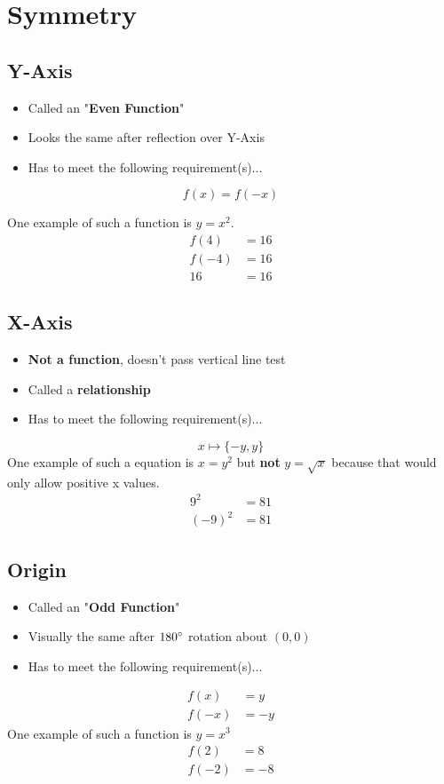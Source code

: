 \documentclass[twocolumn]{article}
\newcommand{\bd}{\textbf}
\newcommand{\dquad}{\quad{}\quad{}}
\begin{document}
	\section{Symmetry}
	\subsection{Y-Axis}
	\begin{itemize}[label=\dquad{}--]
		\item Called an "\bd{Even Function}"
		\item Looks the same after reflection over Y-Axis
		\item Has to meet the following requirement(s)...
	\end{itemize}
	\begin{equation*}
		f(x) = f(-x)
	\end{equation*}
	\par One example of such a function is $y = x^2$.
	\begin{align*}
		f(4) &= 16 \\
		f(-4) &= 16 \\
		16 &= 16
	\end{align*}
	
	\subsection{X-Axis}
	\begin{itemize}[label=\dquad{}--]
		\item \bd{Not a function}, doesn't pass vertical line test
		\item Called a \bd{relationship}
		\item Has to meet the following requirement(s)...
	\end{itemize}
	\begin{equation*}
		x \mapsto \{-y,  y\}
	\end{equation*}
	One example of such a equation is $x = y^2$ but \bd{not} $y = \sqrt{x}$ because that would only allow positive x values.
	\begin{align*}
		9^2 &= 81 \\
		(-9)^2 &= 81
	\end{align*}
	
	\subsection{Origin}
	\begin{itemize}[label=\dquad{}--]
		\item Called an "\bd{Odd Function}"
		\item Visually the same after $180\degree{}$ rotation about $(0, 0)$
		\item Has to meet the following requirement(s)...
	\end{itemize}
	\begin{align*}
		f(x) &= y \\
		f(-x) &= -y
	\end{align*}
	One example of such a function is $y = x^3$
	\begin{align*}
		f(2) &= 8 \\
		f(-2) &= -8
	\end{align*}
	
\end{document}
